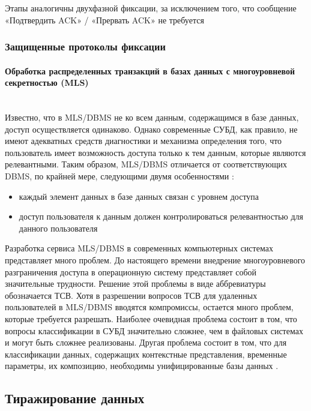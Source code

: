 Этапы аналогичны двухфазной фиксации, за исключением того, что сообщение «Подтвердить ACK» / «Прервать ACK» не требуется

\subsubsection{Защищенные протоколы фиксации}

\paragraph{Обработка распределенных транзакций в базах данных с многоуровневой секретностью (MLS)}~\\
Известно, что в MLS/DBMS не ко всем данным, содержащимся в  базе
данных, доступ осуществляется одинаково. Однако современные СУБД, как
правило,  не имеют адекватных средств диагностики и механизма определения
того, что пользователь имеет возможность доступа только  к  тем
данным,  которые являются релевантными. Таким образом, MLS/DBMS отличается
от соответствующих DBMS,  по крайней  мере,  следующими  двумя
особенностями \autocite{SecureFix}:
\begin{itemize}
    \item каждый элемент данных в базе данных связан с уровнем доступа
    \item доступ пользователя к данным должен контролироваться релевантностью для данного пользователя
\end{itemize}
Разработка сервиса MLS/DBMS в современных компьютерных  системах
представляет  много  проблем. До настоящего времени внедрение многоуровневого
разграничения доступа в операционную  систему  представляет
собой  значительные трудности. Решение этой проблемы в виде аббревиатуры
обозначается ТСВ. Хотя в разрешении вопросов ТСВ  для  удаленных
пользователей  в  MLS/DBMS вводятся компромиссы, остается много проблем,
которые требуется разрешать. Наиболее очевидная проблема состоит
в том, что вопросы классификации в СУБД значительно  сложнее,  чем  в
файловых  системах  и могут быть сложнее реализованы. Другая проблема
состоит в том, что для классификации данных,  содержащих  контекстные
представления,  временные параметры, их композицию, необходимы унифицированные базы данных \autocite{SecureFix}.

\subsection{Тиражирование данных}

